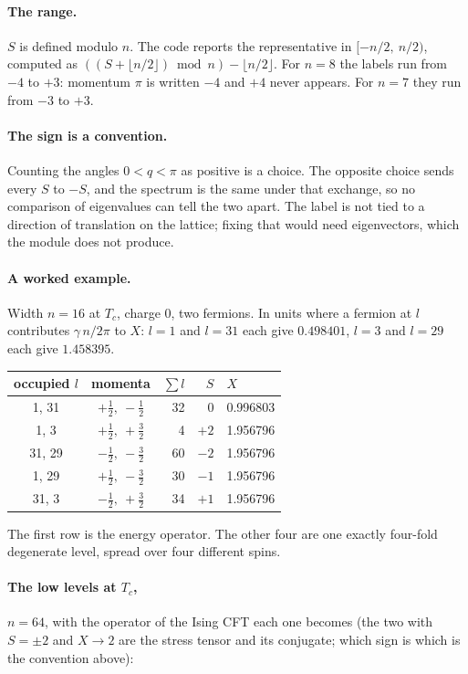 \documentclass[11pt]{article}
\begin{document}
\paragraph{The range.}  $S$ is defined modulo $n$.  The code reports the representative in
$[-n/2,\ n/2)$, computed as $((S + \lfloor n/2 \rfloor) \bmod n) - \lfloor n/2 \rfloor$.  For
$n = 8$ the labels run from $-4$ to $+3$: momentum $\pi$ is written $-4$ and $+4$ never appears.
For $n = 7$ they run from $-3$ to $+3$.

\paragraph{The sign is a convention.}  Counting the angles $0 < q < \pi$ as positive is a choice.
The opposite choice sends every $S$ to $-S$, and the spectrum is the same under that exchange, so
no comparison of eigenvalues can tell the two apart.  The label is not tied to a direction of
translation on the lattice; fixing that would need eigenvectors, which the module does not
produce.

\paragraph{A worked example.}  Width $n = 16$ at $T_c$, charge 0, two fermions.  In units where a
fermion at $l$ contributes $\gamma\, n / 2\pi$ to $X$: $l = 1$ and $l = 31$ each give $0.498401$,
$l = 3$ and $l = 29$ each give $1.458395$.

\begin{center}\begin{tabular}{ccrrl}
\toprule
occupied $l$ & momenta & $\sum l$ & $S$ & $X$ \\
\midrule
1, 31 & $+\tfrac12,\ -\tfrac12$ & 32 & 0 & 0.996803 \\
1, 3 & $+\tfrac12,\ +\tfrac32$ & 4 & $+2$ & 1.956796 \\
31, 29 & $-\tfrac12,\ -\tfrac32$ & 60 & $-2$ & 1.956796 \\
1, 29 & $+\tfrac12,\ -\tfrac32$ & 30 & $-1$ & 1.956796 \\
31, 3 & $-\tfrac12,\ +\tfrac32$ & 34 & $+1$ & 1.956796 \\
\bottomrule
\end{tabular}\end{center}

The first row is the energy operator.  The other four are one exactly four-fold degenerate level,
spread over four different spins.

\paragraph{The low levels at $T_c$,} $n = 64$, with the operator of the Ising CFT each one becomes
(the two with $S = \pm 2$ and $X \to 2$ are the stress tensor and its conjugate; which sign is
which is the convention above):
\end{document}
